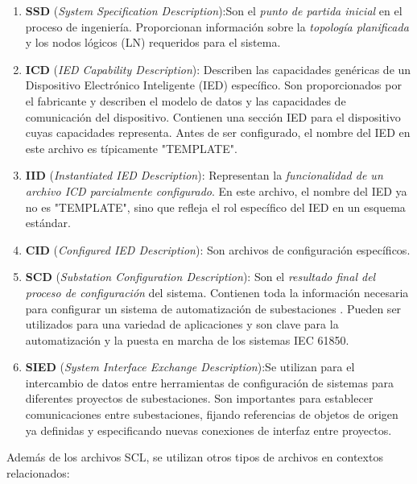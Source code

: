 \documentclass[a5paper]{book}%
\begin{document}
\begin{enumerate}

\item {\textbf{SSD} (\textit{System Specification Description})}:Son el \textit{punto de partida inicial} en el proceso de ingeniería. Proporcionan información sobre la \textit{topología planificada} y los nodos lógicos (LN) requeridos para el sistema.

\item{\textbf{ICD} (\textit{IED Capability Description})}: Describen las capacidades genéricas de un Dispositivo Electrónico Inteligente (IED) específico. Son proporcionados por el fabricante y describen el modelo de datos y las capacidades de comunicación del dispositivo. Contienen una sección IED para el dispositivo cuyas capacidades representa. Antes de ser configurado, el nombre del IED en este archivo es típicamente "TEMPLATE".

\item {\textbf{IID} (\textit{Instantiated IED Description})}: Representan la \textit{funcionalidad de un archivo ICD parcialmente configurado}. En este archivo, el nombre del IED ya no es "TEMPLATE", sino que refleja el rol específico del IED en un esquema estándar.

\item{\textbf{CID} (\textit{Configured IED Description})}: Son archivos de configuración específicos.

\item{\textbf{SCD} (\textit{Substation Configuration Description})}: Son el \textit{resultado final del proceso de configuración} del sistema. Contienen toda la información necesaria para configurar un sistema de automatización de subestaciones . Pueden ser utilizados para una variedad de aplicaciones y son clave para la automatización y la puesta en marcha de los sistemas IEC 61850.

\item {\textbf{SIED} (\textit{System Interface Exchange Description})}:Se utilizan para el intercambio de datos entre herramientas de configuración de sistemas para diferentes proyectos de subestaciones. Son importantes para establecer comunicaciones entre subestaciones, fijando referencias de objetos de origen ya definidas y especificando nuevas conexiones de interfaz entre proyectos.

\end{enumerate}

Además de los archivos SCL, se utilizan otros tipos de archivos en contextos relacionados:
\end{document}
